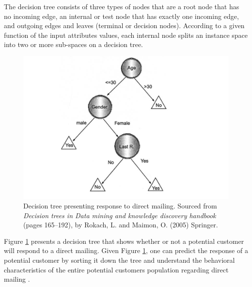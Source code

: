 The decision tree consists of three types of nodes that are a root node that has no incoming edge, an internal or test node that has exactly one incoming edge, and outgoing edges and leaves (terminal or decision nodes). According to a given function of the input attributes values, each internal node splits an instance space into two or more sub-spaces on a decision tree. 

\begin{figure}[H]
	\includegraphics[width=\linewidth]{tree.png}
	\caption{Decision tree presenting response to direct mailing. Sourced from \emph{Decision trees in Data mining and knowledge discovery handbook} (pages 165–192), by Rokach, L. and Maimon, O. (2005) Springer.}
	\label{trep}
	\centering
\end{figure}

Figure \ref{trep} presents a decision tree that shows whether or not a potential customer will respond to a direct mailing. %
Given Figure \ref{trep}, one can predict the response of a potential customer by sorting it down the tree and understand the behavioral characteristics of the entire potential customers population regarding direct mailing \citep{rokach2005decision}.


